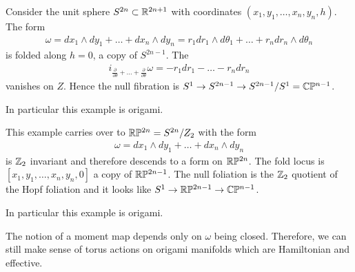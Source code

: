 \documentclass[12pt]{article}
\begin{document}
\begin{example}
    Consider the unit sphere $S^{2n}\subset \mathbb{R}^{2n+1}$ with coordinates $(x_1,y_1,\ldots,x_n,y_n,h)$. The form \begin{align*}
        \omega = dx_1 \wedge dy_1 + \dots + dx_n \wedge dy_n = r_1dr_1\wedge d\theta_1 + \dots + r_n dr_n \wedge d\theta_n
    \end{align*} is folded  along $h=0$, a copy of $S^{2n-1}$. The  \begin{align*}
        i_{\frac{\partial}{\partial\theta} + \dots + \frac{\partial}{\partial\theta}}\omega = -r_1dr_1 - \dots - r_n dr_n
    \end{align*} vanishes on $Z$. Hence the null fibration is $S^1\to S^{2n-1}\to S^{2n-1}/S^1 = \mathbb{C}\mathbb{P}^{n-1}$.

    \hfill

    In particular this example is origami.
\end{example}

\begin{example}
    This example carries over to $\mathbb{R}\mathbb{P}^{2n} = S^{2n}/Z_2$ with the form \begin{align*}
        \omega = dx_1 \wedge dy_1 + \dots + dx_n \wedge dy_n
    \end{align*} is $\mathbb{Z}_2$ invariant and therefore descends to a form on $\mathbb{R}\mathbb{P}^{2n}$. The fold locus is $[x_1,y_1,\dots,x_n,y_n,0]$
    a copy of $\mathbb{R}\mathbb{P}^{2n-1}$. The null foliation is the $\mathbb{Z}_2$ quotient
    of the Hopf foliation and it looks like $S^1\to \mathbb{R}\mathbb{P}^{2n-1}\to \mathbb{C}\mathbb{P}^{n-1}$.

    \hfill

    In particular this example is origami.
\end{example}

The notion of a moment map depends only on $\omega$ being closed. Therefore, we can 
still make sense of torus actions on origami manifolds which are Hamiltonian and effective.
\end{document}
